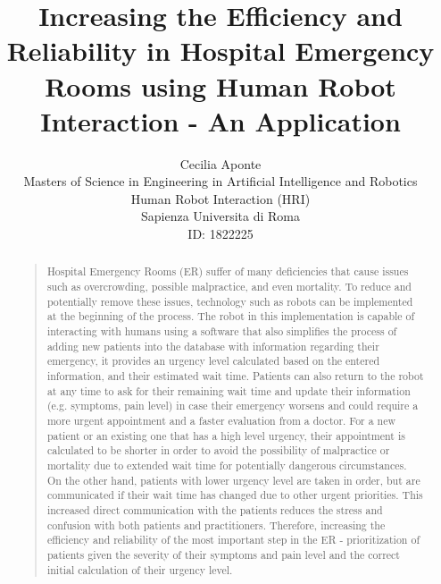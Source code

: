 \documentclass[letterpaper]{article}
\begin{document}
%
\title{Increasing the Efficiency and Reliability in Hospital Emergency Rooms using Human Robot Interaction - An Application}
\author{Cecilia Aponte\\
Masters of Science in Engineering in Artificial Intelligence and Robotics\\
Human Robot Interaction (HRI)\\
Sapienza Universita di Roma\\
ID: 1822225\\
}
\maketitle
\begin{abstract}
\begin{quote}
Hospital Emergency Rooms (ER) suffer of many deficiencies that cause issues such as overcrowding, possible malpractice, and even mortality. To reduce and potentially remove these issues, technology such as robots can be implemented at the beginning of the process. The robot in this implementation is capable of interacting with humans using a software that also simplifies the process of adding new patients into the database with information regarding their emergency, it provides an urgency level calculated based on the entered information, and their estimated wait time. Patients can also return to the robot at any time to ask for their remaining wait time and update their information (e.g. symptoms, pain level) in case their emergency worsens and could require a more urgent appointment and a faster evaluation from a doctor. For a new patient or an existing one that has a high level urgency, their appointment is calculated to be shorter in order to avoid the possibility of malpractice or mortality due to extended wait time for potentially dangerous circumstances. On the other hand, patients with lower urgency level are taken in order, but are communicated if their wait time has changed due to other urgent priorities. This increased direct communication with the patients reduces the stress and confusion with both patients and practitioners. Therefore, increasing the efficiency and reliability of the most important step in the ER - prioritization of patients given the severity of their symptoms and pain level and the correct initial calculation of their urgency level.
\end{quote}
\end{abstract}
\end{document}
